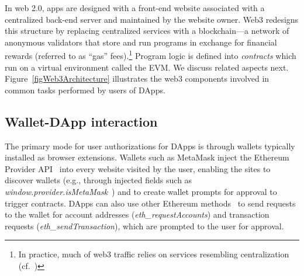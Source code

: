 \documentclass[conference]{IEEEtran}
\begin{document}
In web 2.0, apps are designed with a front-end website associated with a centralized back-end server and maintained by the website owner.
Web3 redesigns this structure by replacing centralized services with a blockchain---a network of anonymous validators that store and run programs in exchange for financial rewards (referred to as ``gas'' fees).\footnote{In practice, much of web3 traffic relies on services resembling centralization (cf.~\cite{williams2020infura})}
Program logic is defined into \textit{contracts} which run on a virtual environment called the \ac*{EVM}.  We discuss related aspects next.
Figure~\ref{figWeb3Architecture} illustrates the web3 components involved in common tasks performed by users of DApps.

\subsection{Wallet-DApp interaction}
The primary mode for user authorizations for DApps is through wallets typically installed as browser extensions.
Wallets such as MetaMask inject the Ethereum Provider API~\cite{providerAPI} into every website visited by the user, enabling the sites to discover wallets (e.g., through injected fields such as \textit{window.provider.isMetaMask}~\cite{metamaskProviderApi}) and to create wallet prompts for approval to trigger contracts.
DApps can also use other Ethereum methods~\cite{metamaskJsonRpcApi} to send requests to the wallet for account addresses (\textit{eth\_requestAccounts})
and transaction requests (\textit{eth\_sendTransaction}), which are prompted to the user for approval.
\end{document}
